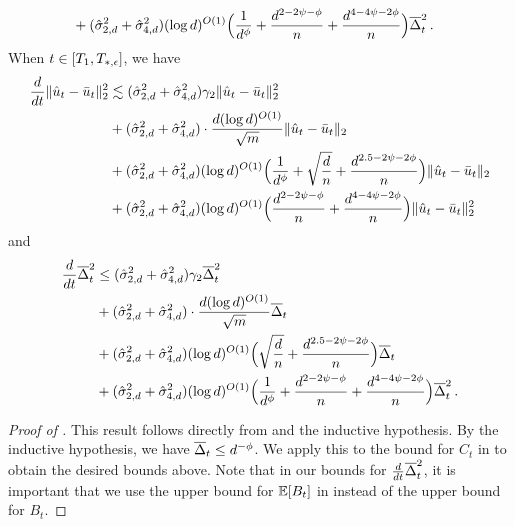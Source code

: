 \begin{lemma}
\begin{align}
& + (\hat{\sigma}_{2, d}^2 + \hat{\sigma}_{4, d}^2) (\log d)^{O(1)} \Big(\frac{1}{d^{\phi}} + \frac{d^{2 - 2\psi - \phi}}{n} + \frac{d^{4 - 4\psi - 2\phi}}{n} \Big) \overline{\Delta}_t^2 \,.
\end{align}
When $t \in [T_1, T_{*, \epsilon}]$, we have
\begin{align}
\frac{d}{dt} \|\hat{u}_t - \bar{u}_t\|_2^2
& \lesssim (\hat{\sigma}_{2, d}^2 + \hat{\sigma}_{4, d}^2) \gamma_2 \|\hat{u}_t - \bar{u}_t\|_2^2 \\
& + (\hat{\sigma}_{2, d}^2 + \hat{\sigma}_{4, d}^2) \cdot \frac{d (\log d)^{O(1)}}{\sqrt{m}} \|\hat{u}_t - \bar{u}_t\|_2 \\
& + (\hat{\sigma}_{2, d}^2 + \hat{\sigma}_{4, d}^2) (\log d)^{O(1)} \Big(\frac{1}{d^{\phi}} + \sqrt{\frac{d}{n}} + \frac{d^{2.5 - 2\psi - 2\phi}}{n}\Big) \|\hat{u}_t - \bar{u}_t\|_2 \\
& + (\hat{\sigma}_{2, d}^2 + \hat{\sigma}_{4, d}^2) (\log d)^{O(1)} \Big(\frac{d^{2 - 2\psi - \phi}}{n} + \frac{d^{4 - 4\psi - 2\phi}}{n} \Big) \|\hat{u}_t - \bar{u}_t\|_2^2
\end{align}
and
\begin{align}
\frac{d}{dt} \overline{\Delta}_t^2
& \leq (\hat{\sigma}_{2, d}^2 + \hat{\sigma}_{4, d}^2) \gamma_2 \overline{\Delta}_t^2 \\
& + (\hat{\sigma}_{2, d}^2 + \hat{\sigma}_{4, d}^2) \cdot \frac{d (\log d)^{O(1)}}{\sqrt{m}} \overline{\Delta}_t \\
& + (\hat{\sigma}_{2, d}^2 + \hat{\sigma}_{4, d}^2) (\log d)^{O(1)} \Big(\sqrt{\frac{d}{n}} + \frac{d^{2.5 - 2\psi - 2\phi}}{n}\Big) \overline{\Delta}_t \\
& + (\hat{\sigma}_{2, d}^2 + \hat{\sigma}_{4, d}^2) (\log d)^{O(1)} \Big(\frac{1}{d^{\phi}} + \frac{d^{2 - 2\psi - \phi}}{n} + \frac{d^{4 - 4\psi - 2\phi}}{n} \Big) \overline{\Delta}_t^2 \,.
\end{align}
\end{lemma}
\begin{proof}[Proof of ]
This result follows directly from  and the inductive hypothesis. By the inductive hypothesis, we have $\overline{\Delta}_t \leq d^{-\phi}$. We apply this to the bound for $C_t$ in  to obtain the desired bounds above. Note that in our bounds for $\frac{d}{dt} \overline{\Delta}_t^2$, it is important that we use the upper bound for $\operatorname*{\mathbb{E}}[B_t]$ in  instead of the upper bound for $B_t$.
\end{proof}

